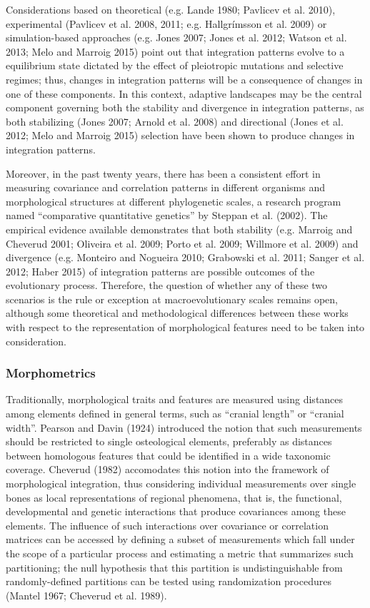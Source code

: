 \documentclass[12pt,]{article}
\begin{document}
Considerations based on theoretical (e.g. Lande 1980; Pavlicev et al.
2010), experimental (Pavlicev et al. 2008, 2011; e.g. Hallgrímsson et
al. 2009) or simulation-based approaches (e.g. Jones 2007; Jones et al.
2012; Watson et al. 2013; Melo and Marroig 2015) point out that
integration patterns evolve to a equilibrium state dictated by the
effect of pleiotropic mutations and selective regimes; thus, changes in
integration patterns will be a consequence of changes in one of these
components. In this context, adaptive landscapes may be the central
component governing both the stability and divergence in integration
patterns, as both stabilizing (Jones 2007; Arnold et al. 2008) and
directional (Jones et al. 2012; Melo and Marroig 2015) selection have
been shown to produce changes in integration patterns.

Moreover, in the past twenty years, there has been a consistent effort
in measuring covariance and correlation patterns in different organisms
and morphological structures at different phylogenetic scales, a
research program named ``comparative quantitative genetics'' by Steppan
et al. (2002). The empirical evidence available demonstrates that both
stability (e.g. Marroig and Cheverud 2001; Oliveira et al. 2009; Porto
et al. 2009; Willmore et al. 2009) and divergence (e.g. Monteiro and
Nogueira 2010; Grabowski et al. 2011; Sanger et al. 2012; Haber 2015) of
integration patterns are possible outcomes of the evolutionary process.
Therefore, the question of whether any of these two scenarios is the
rule or exception at macroevolutionary scales remains open, although
some theoretical and methodological differences between these works with
respect to the representation of morphological features need to be taken
into consideration.

\subsubsection{Morphometrics}\label{morphometrics}

Traditionally, morphological traits and features are measured using
distances among elements defined in general terms, such as ``cranial
length'' or ``cranial width''. Pearson and Davin (1924) introduced the
notion that such measurements should be restricted to single
osteological elements, preferably as distances between homologous
features that could be identified in a wide taxonomic coverage. Cheverud
(1982) accomodates this notion into the framework of morphological
integration, thus considering individual measurements over single bones
as local representations of regional phenomena, that is, the functional,
developmental and genetic interactions that produce covariances among
these elements. The influence of such interactions over covariance or
correlation matrices can be accessed by defining a subset of
measurements which fall under the scope of a particular process and
estimating a metric that summarizes such partitioning; the null
hypothesis that this partition is undistinguishable from
randomly-defined partitions can be tested using randomization procedures
(Mantel 1967; Cheverud et al. 1989).
\end{document}
